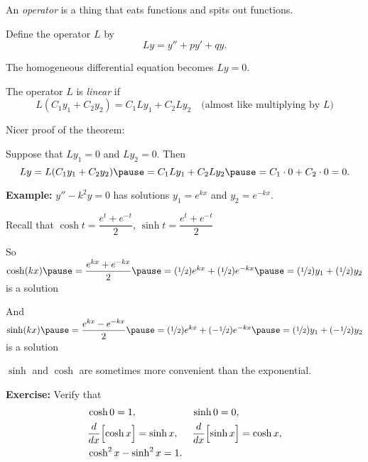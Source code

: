\documentclass[10pt,aspectratio=169]{beamer}
\begin{document}
\begin{frame}

An \emph{operator} is a thing that eats functions and spits out functions.

\medskip
\pause

Define the operator $L$ by
\[
Ly = y'' + py' + qy .
\]

\medskip
\pause

The homogeneous differential equation becomes $Ly=0$.

\medskip
\pause

The operator $L$ is \emph{linear} if 
\[
L(C_1y_1 + C_2y_2) = 
C_1 Ly_1 + C_2 Ly_2
\quad \text{(almost like multiplying by $L$)}
\] 

\medskip
\pause

Nicer proof of the theorem:

\medskip
\pause

Suppose that $Ly_1 =0$ and $Ly_2=0$.
\pause
Then
\[
Ly = L(C_1y_1 + C_2y_2) \pause = 
C_1 Ly_1 + C_2 Ly_2 \pause = C_1 \cdot 0 + C_2 \cdot 0 = 0 .
\]

\end{frame}

\begin{frame}
\textbf{Example:}
$y'' - k^2y = 0$ has solutions
$y_1 = e^{kx}$ and 
$y_2 = e^{-kx}$.

\medskip
\pause

Recall that 
\quad
$\cosh t = \dfrac{e^{t}  + e^{-t}}{2}$,
\quad
$\sinh t = \dfrac{e^{t}  + e^{-t}}{2}$

\medskip
\pause

So
\quad
$\cosh(kx)
\pause = \dfrac{e^{kx}  + e^{-kx}}{2}
\pause = (\nicefrac{1}{2}) e^{kx}  + (\nicefrac{1}{2}) e^{-kx}
\pause = (\nicefrac{1}{2}) y_1  + (\nicefrac{1}{2}) y_2$
\quad
is a solution

\medskip
\pause

And
\quad
$\sinh(kx)
\pause = \dfrac{e^{kx}  - e^{-kx}}{2}
\pause = (\nicefrac{1}{2}) e^{kx}  + (-\nicefrac{1}{2}) e^{-kx}
\pause = (\nicefrac{1}{2}) y_1  + (-\nicefrac{1}{2}) y_2$
\quad
is a solution

\medskip
\pause

$\sinh$ and $\cosh$ are sometimes more convenient than the
exponential.

\medskip
\pause

\textbf{Exercise:} Verify that
\begin{align*}
& \cosh 0  = 1 , &   & \sinh 0 = 0 , \\
& \frac{d}{dx} \Bigl[ \cosh x \Bigr] = \sinh x , &  & \frac{d}{dx} \Bigl[ \sinh x \Bigr] = \cosh x , \\
& \cosh^2 x - \sinh^2 x = 1 .
\end{align*}

\end{frame}
\end{document}
